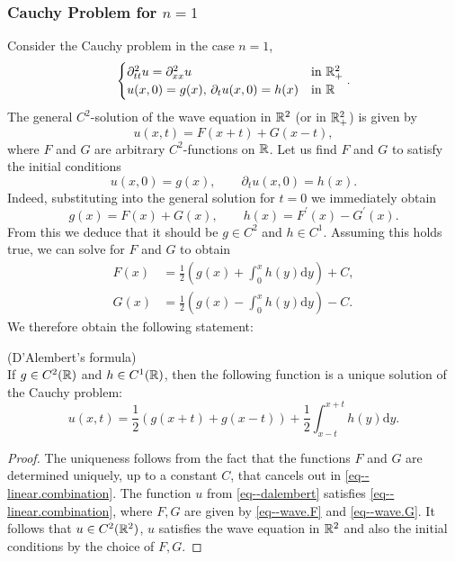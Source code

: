 \documentclass[11pt]{article}
\begin{document}
			\subsubsection*{Cauchy Problem for $n=1$}

				Consider the Cauchy problem in the case $n=1$,
				\begin{equation}\label{eq--wave.cauchy}
					\begin{cases}
						\partial_{tt}^2u=\partial_{xx}^2u & \text{in }\mathbb{R}^2_+\\
						u(x,0)=g(x),\,\partial_tu(x,0)=h(x) & \text{in }\mathbb{R} 
					\end{cases}.
				\end{equation}
				The general $C^2$-solution of the wave equation in $\mathbb{R}^2$ (or in $\mathbb{R}^2_+$) is given by
				\begin{equation}\label{eq--linear.combination}
					u(x,t)=F(x+t)+G(x-t),
				\end{equation} 
				where $F$ and $G$ are arbitrary $C^2$-functions on $\mathbb{R}$. Let us find $F$ and $G$ to satisfy the initial conditions
				\begin{equation*}
					u(x,0)=g(x),\qquad \partial_tu(x,0)=h(x).
				\end{equation*}
				Indeed, substituting into the general solution for $t=0$ we immediately obtain
				\begin{equation}
					g(x)=F(x)+G(x),\qquad h(x)=F^\prime(x)-G^\prime(x).\label{eq--wave.gh}
				\end{equation}
				From this we deduce that it should be $g\in C^2$ and $h\in C^1$. Assuming this holds true, we can solve for $F$ and $G$ to obtain
				\begin{align}
					F(x)&=\frac{1}{2}\left(g(x)+\int_0^xh(y)\mathrm{d}y\right)+C,\label{eq--wave.F}\\
					G(x)&=\frac{1}{2}\left(g(x)-\int_0^xh(y)\mathrm{d}y\right)-C.\label{eq--wave.G}
				\end{align}
				We therefore obtain the following statement:

				\begin{thm}
					(D'Alembert's formula)\\
					If $g\in C^2(\mathbb{R})$ and $h\in C^1(\mathbb{R})$, then the following function is a unique solution of the Cauchy problem:
					\begin{equation}\label{eq--dalembert}
						u(x,t)=\frac{1}{2}\left(g(x+t)+g(x-t)\right)+\frac{1}{2}\int_{x-t}^{x+t}h(y)\mathrm{d}y.
					\end{equation}
				\end{thm}
				\begin{proof}
					The uniqueness follows from the fact that the functions $F$ and $G$ are determined uniquely, up to a constant $C$, that cancels out in \eqref{eq--linear.combination}. The function $u$ from \eqref{eq--dalembert} satisfies \eqref{eq--linear.combination}, where $F,G$ are given by \eqref{eq--wave.F} and \eqref{eq--wave.G}. It follows that $u\in C^2(\mathbb{R}^2)$, $u$ satisfies the wave equation in $\mathbb{R}^2$ and also the initial conditions by the choice of $F,G$.
				\end{proof}
\end{document}
